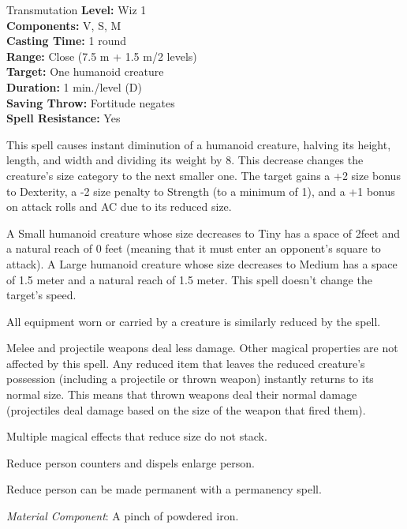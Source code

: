 {Transmutation}
{
	\textbf{Level:}
	Wiz 1\\
	\textbf{Components:}
	V, S, M\\
	\textbf{Casting Time:}
	1 round\\
	\textbf{Range:}
	Close (7.5 m + 1.5 m/2 levels)\\
	\textbf{Target:}
	One humanoid creature\\
	\textbf{Duration:}
	1 min./level (D)\\
	\textbf{Saving Throw:}
	Fortitude negates\\
	\textbf{Spell Resistance:}
	Yes\\
}
{
	This spell causes instant diminution of a humanoid creature, halving its height, length, and width and dividing its weight by 8. This decrease changes the creature's size category to the next smaller one. The target gains a +2 size bonus to Dexterity, a -2 size penalty to Strength (to a minimum of 1), and a +1 bonus on attack rolls and AC due to its reduced size.

	A Small humanoid creature whose size decreases to Tiny has a space of 2\onehalf feet and a natural reach of 0 feet (meaning that it must enter an opponent's square to attack). A Large humanoid creature whose size decreases to Medium has a space of 1.5 meter and a natural reach of 1.5 meter. This spell doesn't change the target's speed.

	All equipment worn or carried by a creature is similarly reduced by the spell.

	Melee and projectile weapons deal less damage. Other magical properties are not affected by this spell. Any reduced item that leaves the reduced creature's possession (including a projectile or thrown weapon) instantly returns to its normal size. This means that thrown weapons deal their normal damage (projectiles deal damage based on the size of the weapon that fired them).

	Multiple magical effects that reduce size do not stack.

	Reduce person counters and dispels enlarge person.

	Reduce person can be made permanent with a permanency spell.

	\textit{Material Component}:
	A pinch of powdered iron.

}
